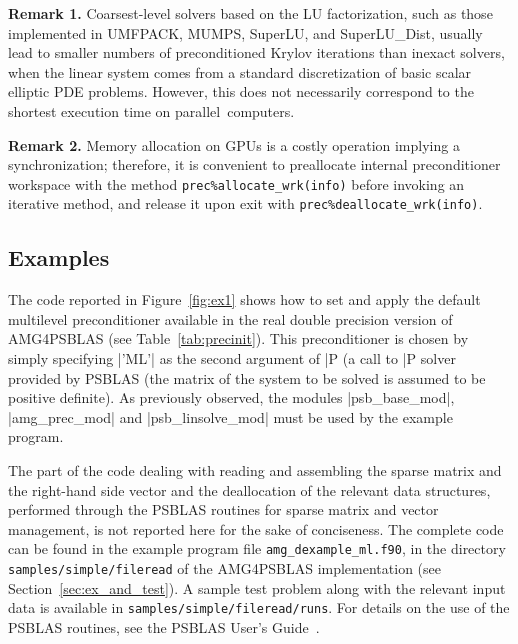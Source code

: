 \textbf{Remark 1.} Coarsest-level solvers based on the LU factorization,
such as those implemented in UMFPACK, MUMPS, SuperLU, and SuperLU\_Dist,
usually lead to smaller numbers of preconditioned Krylov
iterations than inexact solvers, when the linear system comes from
a standard discretization of basic scalar elliptic PDE problems. However,
this does not necessarily correspond to the shortest execution time
on parallel~computers.

\textbf{Remark 2.} Memory allocation on GPUs is a costly operation
implying a synchronization; therefore, it is convenient to preallocate
internal preconditioner workspace with the method
\verb|prec%allocate_wrk(info)| before invoking an iterative method,
and release it upon exit with \verb|prec%deallocate_wrk(info)|.


\subsection{Examples\label{sec:examples}}

The code reported in Figure~\ref{fig:ex1} shows how to set and apply the default
multilevel preconditioner available in the real double precision version
of AMG4PSBLAS (see Table~\ref{tab:precinit}). This preconditioner is chosen
by simply specifying \fortinline|'ML'| as the second argument of \fortinline|P%
(a call to \fortinline|P%
solver provided by PSBLAS (the matrix of the system to be solved is
assumed to be positive definite). As previously observed, the modules
\fortinline|psb_base_mod|, \fortinline|amg_prec_mod| and \fortinline|psb_linsolve_mod|
must be used by the example program.

The part of the code dealing with reading and assembling  the sparse
matrix and the right-hand side vector and the deallocation of the
relevant data structures, performed 
through the PSBLAS routines for sparse matrix and vector management, is not reported
here for the sake of conciseness.
The complete code can be found in the example program file \verb|amg_dexample_ml.f90|,
in the directory \verb|samples/simple/file|\-\verb|read| of the AMG4PSBLAS implementation (see
Section~\ref{sec:ex_and_test}). A sample test problem along with the relevant
input data is available in \verb|samples/simple/fileread/runs|.
For details on the use of the PSBLAS routines, see the PSBLAS User's
Guide~\cite{PSBLASGUIDE}.

